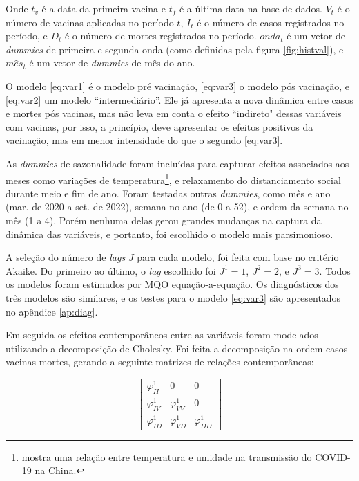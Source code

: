 \documentclass[
	12pt,				%
	oneside,			%
	a4paper,			%
	english,			%
	brazil				%
	hyperref = {colorlinks, citecolor=c1d, linkcolor=c2d, urlcolor=c3d, colorlinks}
	]{abntex2}
\newcounter{j}
\begin{document}
\noindent Onde $t_v$ é a data da primeira vacina e $t_f$ é a última data na base de dados. $V_t$ é o número de vacinas aplicadas no período $t$, $I_t$ é o número de casos registrados no período, e  $D_t$ é o número de mortes registrados no período. $onda_t$ é um vetor de \textit{dummies} de primeira e segunda onda (como definidas pela figura \ref{fig:histval}), e $m\hat{e}s_t$ é um vetor de \textit{dummies} de mês do ano.

O modelo \eqref{eq:var1} é o modelo pré vacinação, \eqref{eq:var3} o modelo pós vacinação, e \eqref{eq:var2} um modelo ``intermediário''. Ele já apresenta a nova dinâmica entre casos e mortes pós vacinas, mas não leva em conta o efeito ``indireto" dessas variáveis com vacinas, por isso, a princípio, deve apresentar os efeitos positivos da vacinação, mas em menor intensidade do que o segundo \eqref{eq:var3}.

As \textit{dummies} de sazonalidade foram incluídas para capturar efeitos associados aos meses como variações de temperatura\footnote{\cite{Qi2020} mostra uma relação entre temperatura e umidade na transmissão do COVID-19 na China.}, e relaxamento do distanciamento social durante meio e fim de ano. Foram testadas outras \textit{dummies}, como mês e ano (mar. de 2020 a set. de 2022), semana no ano (de 0 a 52), e ordem da semana no mês (1 a 4). Porém nenhuma delas gerou grandes mudanças na captura da dinâmica das variáveis, e portanto, foi escolhido o modelo mais parsimonioso.

A seleção do número de \textit{lags} $J$ para cada modelo, foi feita com base no critério Akaike. Do primeiro ao último, o \textit{lag} escolhido foi $J^1 = 1$, $J^2=2$, e $J^3=3$. Todos os modelos foram estimados por MQO equação-a-equação. Os diagnósticos dos três modelos são similares, e os testes para o modelo \eqref{eq:var3} são apresentados no apêndice \ref{ap:diag}.

Em seguida os efeitos contemporâneos entre as variáveis foram modelados utilizando a decomposição de Cholesky. Foi feita a decomposição na ordem casos-vacinas-mortes, gerando a seguinte matrizes de relações contemporâneas:

\begin{equation}\label{eq:svar}
    \begin{bmatrix}
    \varphi_{II}^1 & 0 & 0 \\
    \varphi_{IV}^1 & \varphi_{VV}^1 & 0 \\
    \varphi_{ID}^1 & \varphi_{VD}^1 & \varphi_{DD}^1
    \end{bmatrix}
\end{equation}
\end{document}
